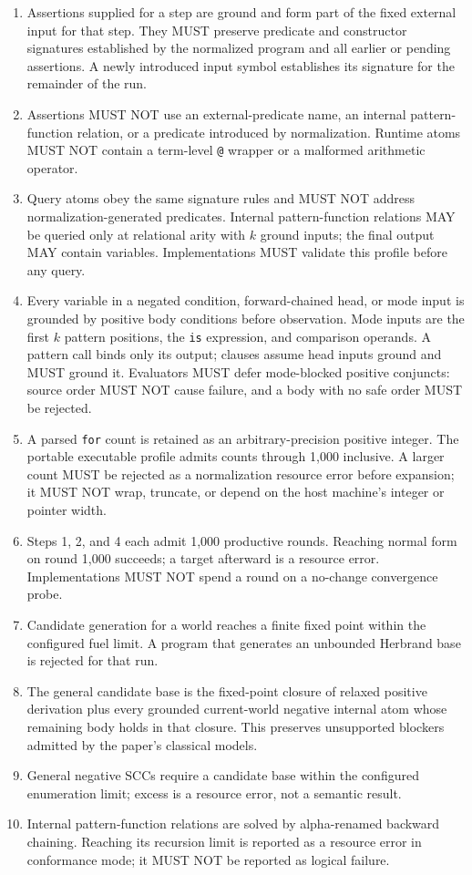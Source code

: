 \documentclass[11pt]{article}
\begin{document}
\begin{enumerate}
  \item Assertions supplied for a step are ground and form part of the fixed
  external input for that step.  They MUST preserve predicate and constructor
  signatures established by the normalized program and all earlier or pending
  assertions.  A newly introduced input symbol establishes its signature for
  the remainder of the run.
  \item Assertions MUST NOT use an external-predicate name, an internal
  pattern-function relation, or a predicate introduced by normalization.
  Runtime atoms MUST NOT contain a term-level \verb|@| wrapper or a malformed
  arithmetic operator.
  \item Query atoms obey the same signature rules and MUST NOT address
  normalization-generated predicates.  Internal pattern-function relations
  MAY be queried only at relational arity with $k$ ground inputs; the final
  output MAY contain variables.  Implementations MUST validate this profile
  before any query.
  \item Every variable in a negated condition, forward-chained head, or
  mode input is grounded by positive body conditions before observation.  Mode
  inputs are the first $k$ pattern positions, the \verb|is| expression, and
  comparison operands.  A pattern call binds only its output; clauses assume
  head inputs ground and MUST ground it.  Evaluators MUST defer mode-blocked
  positive conjuncts: source order MUST NOT cause failure, and a body with no
  safe order MUST be rejected.
  \item A parsed \verb|for| count is retained as an arbitrary-precision
  positive integer.  The portable executable profile admits counts through
  1,000 inclusive.  A larger count MUST be rejected as a normalization
  resource error before expansion; it MUST NOT wrap, truncate, or depend on
  the host machine's integer or pointer width.
  \item Steps 1, 2, and 4 each admit 1,000 productive rounds.  Reaching normal
  form on round 1,000 succeeds; a target afterward is a resource error.
  Implementations MUST NOT spend a round on a no-change convergence probe.
  \item Candidate generation for a world reaches a finite fixed point within
  the configured fuel limit.  A program that generates an unbounded Herbrand
  base is rejected for that run.
  \item The general candidate base is the fixed-point closure of relaxed
  positive derivation plus every grounded current-world negative internal atom
  whose remaining body holds in that closure.  This preserves unsupported
  blockers admitted by the paper's classical models.
  \item General negative SCCs require a candidate base within the configured
  enumeration limit; excess is a resource error, not a semantic result.
  \item Internal pattern-function relations are solved by alpha-renamed
  backward chaining.  Reaching its recursion limit is reported as a resource
  error in conformance mode; it MUST NOT be reported as logical failure.
\end{enumerate}
\end{document}
